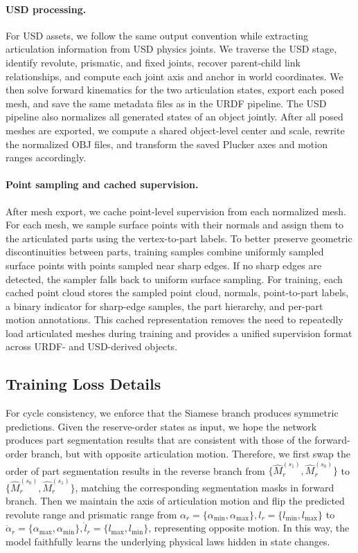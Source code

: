 \paragraph{USD processing.}
For USD assets, we follow the same output convention while extracting articulation information from USD physics joints. We traverse the USD stage, identify revolute, prismatic, and fixed joints, recover parent-child link relationships, and compute each joint axis and anchor in world coordinates. We then solve forward kinematics for the two articulation states, export each posed mesh, and save the same metadata files as in the URDF pipeline.
% 
The USD pipeline also normalizes all generated states of an object jointly. After all posed meshes are exported, we compute a shared object-level center and scale, rewrite the normalized OBJ files, and transform the saved Plucker axes and motion ranges accordingly. 

\paragraph{Point sampling and cached supervision.}
After mesh export, we cache point-level supervision from each normalized mesh. For each mesh, we sample surface points with their normals and assign them to the articulated parts using the vertex-to-part labels. To better preserve geometric discontinuities between parts, training samples combine uniformly sampled surface points with points sampled near sharp edges. If no sharp edges are detected, the sampler falls back to uniform surface sampling.
% 
For training, each cached point cloud stores the sampled point cloud, normals, point-to-part labels, a binary indicator for sharp-edge samples, the part hierarchy, and per-part motion annotations.
% 
This cached representation removes the need to repeatedly load articulated meshes during training and provides a unified supervision format across URDF- and USD-derived objects.

\subsection{Training Loss Details}
\label{sec:supp_loss_details}

For cycle consistency, we enforce that the Siamese branch produces symmetric predictions. Given the reserve-order states as input, we hope the network produces part segmentation results that are consistent with those of the forward-order branch, but with opposite articulation motion. Therefore, we first swap the order of part segmentation results in the reverse branch from $\{\hat{M}_{r}^{(s_1)},\hat{M}_{r}^{(s_0)}\}$ to $\{\hat{M}_{r}^{(s_0)},\hat{M}_{r}^{(s_1)}\}$, matching the corresponding segmentation masks in forward branch.
Then we maintain the axis of articulation motion and flip the predicted revolute range and prismatic range from $\alpha_r = \{\alpha_{\min}, \alpha_{\max}\}, l_r = \{l_{\min}, l_{\max}\}$ to $\dot{\alpha}_r = \{\alpha_{\max}, \alpha_{\min}\}, \dot{l}_r = \{l_{\max}, l_{\min}\}$, representing opposite motion.
In this way, the model faithfully learns the underlying physical laws hidden in state changes.


